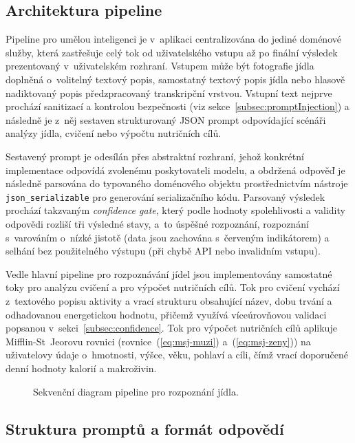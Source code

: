 \subsection{Architektura pipeline}
\label{subsec:aiPipeline}

Pipeline pro umělou inteligenci je v~aplikaci centralizována do jediné doménové služby, která zastřešuje celý tok od uživatelského vstupu až po finální výsledek prezentovaný v~uživatelském rozhraní.
Vstupem může být fotografie jídla doplněná o~volitelný textový popis, samostatný textový popis jídla nebo hlasově nadiktovaný popis předzpracovaný transkripční vrstvou.
Vstupní text nejprve prochází sanitizací a kontrolou bezpečnosti (viz sekce~\ref{subsec:promptInjection}) a následně je z~něj sestaven strukturovaný JSON prompt odpovídající scénáři analýzy jídla, cvičení nebo výpočtu nutričních cílů.

Sestavený prompt je odesílán přes abstraktní rozhraní, jehož konkrétní implementace odpovídá zvolenému poskytovateli modelu, a obdržená odpověď je následně parsována do typovaného doménového objektu prostřednictvím nástroje \texttt{json\_serializable} pro generování serializačního kódu.
Parsovaný výsledek prochází takzvaným \emph{confidence gate}, který podle hodnoty spolehlivosti a validity odpovědi rozliší tři výsledné stavy, a~to úspěšné rozpoznání, rozpoznání s~varováním o~nízké jistotě (data jsou zachována s~červeným indikátorem) a selhání bez použitelného výstupu (při chybě API nebo invalidním vstupu).

Vedle hlavní pipeline pro rozpoznávání jídel jsou implementovány samostatné toky pro analýzu cvičení a pro výpočet nutričních cílů.
Tok pro cvičení vychází z~textového popisu aktivity a vrací strukturu obsahující název, dobu trvání a odhadovanou energetickou hodnotu, přičemž využívá víceúrovňovou validaci popsanou v~sekci~\ref{subsec:confidence}.
Tok pro výpočet nutričních cílů aplikuje Mifflin-St~Jeorovu rovnici (rovnice~(\ref{eq:msj-muzi}) a~(\ref{eq:msj-zeny})) na uživatelovy údaje o~hmotnosti, výšce, věku, pohlaví a cíli, čímž vrací doporučené denní hodnoty kalorií a makroživin.

\begin{figure}[!htb]
	\centering
	\resizebox{0.95\textwidth}{!}{}
	\caption{Sekvenční diagram pipeline pro rozpoznání jídla.}
	\label{fig:aiPipeline}
\end{figure}

\subsection{Struktura promptů a formát odpovědí}
\label{subsec:prompty}

